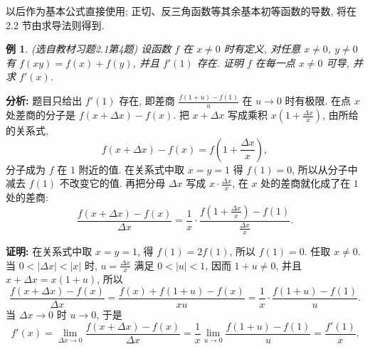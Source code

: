 \documentclass[UTF8,openany]{ctexbook}
\theoremstyle{chinesetextbook}
\newtheorem{example}{例}[section]
\newenvironment{cnproof}{\par\indent\textbf{证明:} \ignorespaces}{\par}
\begin{document}
以后作为基本公式直接使用; 正切、反三角函数等其余基本初等函数的导数, 将在 2.2 节由求导法则得到.
\begin{example}\label{ex:c2-h1-4}
\textnormal{(选自教材习题2.1第4题)} 设函数 $f$ 在 $x\ne0$ 时有定义, 对任意 $x\ne0$, $y\ne0$ 有 $f(xy)=f(x)+f(y)$, 并且 $f'(1)$ 存在. 证明 $f$ 在每一点 $x\ne0$ 可导, 并求 $f'(x)$.
\end{example}
\par\indent\textbf{分析:} 题目只给出 $f'(1)$ 存在, 即差商 $\displaystyle\frac{f(1+u)-f(1)}u$ 在 $u\to0$ 时有极限. 在点 $x$ 处差商的分子是 $f(x+\Delta x)-f(x)$. 把 $x+\Delta x$ 写成乘积 $\displaystyle x\left(1+\frac{\Delta x}x\right)$, 由所给的关系式,
\[
f(x+\Delta x)-f(x)=f\left(1+\frac{\Delta x}x\right),
\]
分子成为 $f$ 在 $1$ 附近的值. 在关系式中取 $x=y=1$ 得 $f(1)=0$, 所以从分子中减去 $f(1)$ 不改变它的值. 再把分母 $\Delta x$ 写成 $\displaystyle x\cdot\frac{\Delta x}x$, 在 $x$ 处的差商就化成了在 $1$ 处的差商:
\[
\frac{f(x+\Delta x)-f(x)}{\Delta x}=\frac1x\cdot\frac{f\left(1+\frac{\Delta x}x\right)-f(1)}{\frac{\Delta x}x}.
\]
\begin{cnproof}
在关系式中取 $x=y=1$, 得 $f(1)=2f(1)$, 所以 $f(1)=0$. 任取 $x\ne0$. 当 $0<|\Delta x|<|x|$ 时, $\displaystyle u=\frac{\Delta x}x$ 满足 $0<|u|<1$, 因而 $1+u\ne0$, 并且 $x+\Delta x=x(1+u)$, 所以
\[
\frac{f(x+\Delta x)-f(x)}{\Delta x}=\frac{f(x)+f(1+u)-f(x)}{xu}=\frac1x\cdot\frac{f(1+u)-f(1)}u.
\]
当 $\Delta x\to0$ 时 $u\to0$, 于是
\[
f'(x)=\lim_{\Delta x\to0}\frac{f(x+\Delta x)-f(x)}{\Delta x}=\frac1x\lim_{u\to0}\frac{f(1+u)-f(1)}u=\frac{f'(1)}x.
\]
\end{cnproof}
\end{document}
